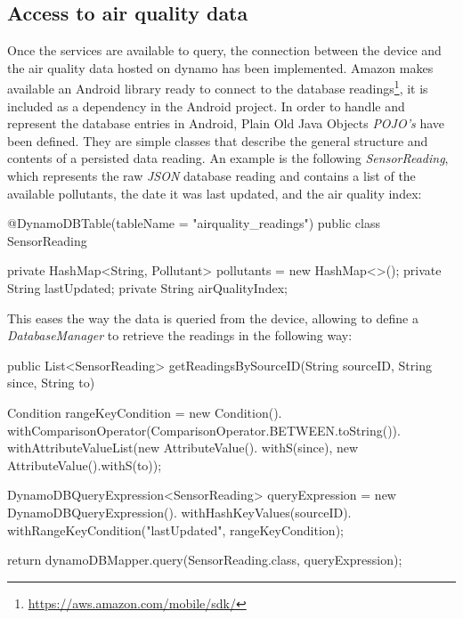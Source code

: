 \subsection{Access to air quality data}
Once the services are available to query, the connection between the device and the air quality data hosted on dynamo has been implemented. Amazon makes available an Android library ready to connect to the database readings\footnote{\url{https://aws.amazon.com/mobile/sdk/}}, it is included as a dependency in the Android project. In order to handle and represent the database entries in Android, Plain Old Java Objects \textit{POJO's} have been defined. They are simple classes that describe the general structure and contents of a persisted data reading. An example is the following \textit{SensorReading}, which represents the raw \textit{JSON} database reading  and contains a list of the available pollutants, the date it was last updated, and the air quality index:

{\centering
\begin{spverbatim}

@DynamoDBTable(tableName = "airquality_readings")
public class SensorReading {

    private HashMap<String, Pollutant> pollutants = new HashMap<>();
    private String lastUpdated;
    private String airQualityIndex;
}
\end{spverbatim}
\par
}

This eases the way the data is queried from the device, allowing to define a \textit{DatabaseManager} to retrieve the readings in the following way: 

{\centering
\begin{spverbatim}
public List<SensorReading> getReadingsBySourceID(String sourceID, String since, String to) {

  Condition rangeKeyCondition = new Condition().
    withComparisonOperator(ComparisonOperator.BETWEEN.toString()).
    withAttributeValueList(new AttributeValue().
    withS(since), new AttributeValue().withS(to));

  DynamoDBQueryExpression<SensorReading> queryExpression = new
    DynamoDBQueryExpression().
    withHashKeyValues(sourceID).
    withRangeKeyCondition("lastUpdated", rangeKeyCondition);
  
return dynamoDBMapper.query(SensorReading.class, queryExpression);
}
\end{spverbatim}
\par
}

